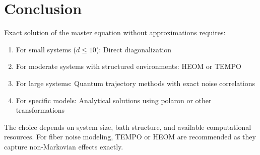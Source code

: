 \documentclass[12pt]{article}
\begin{document}
\section{Conclusion}

Exact solution of the master equation without approximations requires:
\begin{enumerate}
\item For small systems ($d \leq 10$): Direct diagonalization
\item For moderate systems with structured environments: HEOM or TEMPO
\item For large systems: Quantum trajectory methods with exact noise correlations
\item For specific models: Analytical solutions using polaron or other transformations
\end{enumerate}

The choice depends on system size, bath structure, and available computational resources. For fiber noise modeling, TEMPO or HEOM are recommended as they capture non-Markovian effects exactly.
\end{document}

